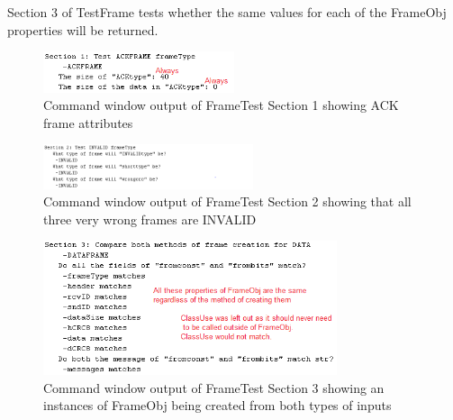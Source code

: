 Section 3 of TestFrame tests whether the same values for each of the FrameObj properties will be returned. 





\begin{figure}[p]
    \includegraphics[width=0.5\textwidth, left]{FrameTest1.PNG}
    \caption{Command window output of FrameTest Section 1 showing ACK frame attributes }
    \label{fig:FrameTest1}
\end{figure}

\begin{figure}[p]
    \includegraphics[width=0.55\textwidth, left]{FrameTest2.PNG}
    \caption{Command window output of FrameTest Section 2 showing that all three very wrong frames are INVALID }
    \label{fig:FrameTest2}
\end{figure}

\begin{figure}[p]
    \includegraphics[width=0.77\textwidth, left]{FrameTest3.PNG}
    \caption{Command window output of FrameTest Section 3 showing an instances of FrameObj being created from both types of inputs }
    \label{fig:FrameTest3}
\end{figure}

